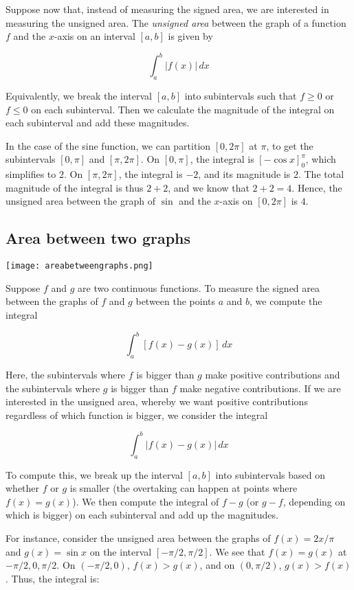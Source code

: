 \documentclass[10pt]{amsart}
\begin{document}
Suppose now that, instead of measuring the signed area, we are
interested in measuring the unsigned area. The {\em unsigned area}
between the graph of a function $f$ and the $x$-axis on an interval
$[a,b]$ is given by

$$\int_a^b |f(x)| \, dx$$

Equivalently, we break the interval $[a,b]$ into subintervals such
that $f \ge 0$ or $f \le 0$ on each subinterval. Then we calculate the
magnitude of the integral on each subinterval and add these
magnitudes.

In the case of the sine function, we can partition $[0,2\pi]$ at
$\pi$, to get the subintervals $[0,\pi]$ and $[\pi,2\pi]$. On
$[0,\pi]$, the integral is $[-\cos x]_0^\pi$, which simplifies to
$2$. On $[\pi,2\pi]$, the integral is $-2$, and its magnitude is
$2$. The total magnitude of the integral is thus $2 + 2$, and we know
that $2 + 2 = 4$. Hence, the unsigned area between the graph of $\sin$
and the $x$-axis on $[0,2\pi]$ is $4$. 

\subsection{Area between two graphs}

\texttt{[image: areabetweengraphs.png]}

Suppose $f$ and $g$ are two continuous functions. To measure the
signed area between the graphs of $f$ and $g$ between the points $a$
and $b$, we compute the integral

$$\int_a^b [f(x) - g(x)] \, dx$$

Here, the subintervals where $f$ is bigger than $g$ make positive
contributions and the subintervals where $g$ is bigger than $f$ make
negative contributions. If we are interested in the unsigned area,
whereby we want positive contributions regardless of which function is
bigger, we consider the integral

$$\int_a^b |f(x) - g(x)| \, dx$$

To compute this, we break up the interval $[a,b]$ into subintervals
based on whether $f$ or $g$ is smaller (the overtaking can happen at
points where $f(x) = g(x)$). We then compute the integral of $f - g$
(or $g - f$, depending on which is bigger) on each subinterval and add
up the magnitudes.

For instance, consider the unsigned area between the graphs of $f(x) =
2x/\pi$ and $g(x) = \sin x$ on the interval $[-\pi/2,\pi/2]$. We see
that $f(x) = g(x)$ at $-\pi/2,0,\pi/2$. On $(-\pi/2,0)$, $f(x) >
g(x)$, and on $(0,\pi/2)$, $g(x) > f(x)$. Thus, the integral is:
\end{document}
